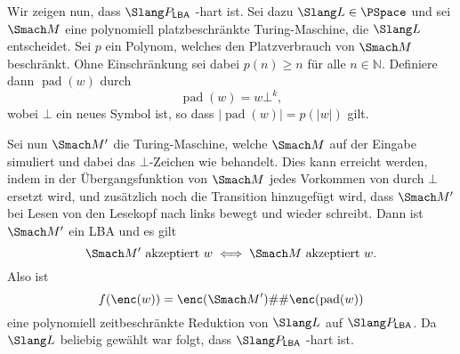 \documentclass[german]{latteachCD}[2017/03/28]
\begin{document}
\def\pad{\operatorname{pad}}

Wir zeigen nun, dass $\Slang P_{\mathsf{LBA}}$ \PSpace-hart ist.  Sei dazu
$\Slang L \in \PSpace$ und sei $\Smach M$ eine polynomiell platzbeschränkte
Turing-Maschine, die $\Slang L$ entscheidet.  Sei $p$ ein Polynom, welches den
Platzverbrauch von $\Smach M$ beschränkt.  Ohne Einschränkung sei dabei $p(n)
\geq n$ für alle $n \in \mathbb N$.  Definiere dann $\pad(w)$ durch
\begin{equation*}
  \pad(w) = w\bot^{k},
\end{equation*}
wobei $\bot$ ein neues Symbol ist, so dass $\lvert \pad(w)\rvert = p(\lvert
w\rvert)$ gilt.

Sei nun $\Smach M'$ die Turing-Maschine, welche $\Smach M$ auf der Eingabe
simuliert und dabei das $\bot$-Zeichen wie \blank{} behandelt.  Dies kann
erreicht werden, indem in der Übergangsfunktion von $\Smach M$ jedes Vorkommen
von \blank{} durch $\bot$ ersetzt wird, und zusätzlich noch die Transition
hinzugefügt wird, dass $\Smach M'$ bei Lesen von \blank{} den Lesekopf nach
links bewegt und \blank{} wieder schreibt.  Dann ist $\Smach M'$ ein LBA und es gilt
\begin{equation*}
  \Smach M' \text{ akzeptiert } w \iff \Smach M \text{ akzeptiert } w.
\end{equation*}
Also ist
\begin{equation*}
  f(\enc(w)) = \enc(\Smach M')\#\#\enc(\pad(w))
\end{equation*}
eine polynomiell zeitbeschränkte Reduktion von $\Slang L$ auf $\Slang
P_{\mathsf{LBA}}$.  Da $\Slang L$ beliebig gewählt war folgt, dass $\Slang
P_{\mathsf{LBA}}$ \PSpace-hart ist.
\end{document}
